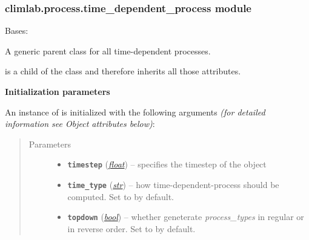 \documentclass[letterpaper,10pt,english]{sphinxmanual}
\begin{document}
\subsubsection{climlab.process.time\_dependent\_process module}
\label{api/climlab.process:climlab-process-time-dependent-process-module}\label{api/climlab.process:module-climlab.process.time_dependent_process}

\begin{fulllineitems}
\label{api/climlab.process:climlab.process.time_dependent_process.TimeDependentProcess}
Bases: {\hyperref[api/climlab.process:climlab.process.process.Process]{\emph{}}}

A generic parent class for all time-dependent processes.

 is a child of the 
{\hyperref[api/climlab.process:climlab.process.process.Process]{\emph{}}} class and therefore inherits
all those attributes.

\textbf{Initialization parameters}

An instance of  is initialized with the following 
arguments \emph{(for detailed information see Object attributes below)}:
\begin{quote}\begin{description}
\item[{Parameters}] \leavevmode\begin{itemize}
\item {} 
\textbf{\texttt{timestep}} (\href{http://docs.python.org/2.7/library/functions.html\#float}{\emph{float}}) -- specifies the timestep of the object

\item {} 
\textbf{\texttt{time\_type}} (\href{http://docs.python.org/2.7/library/functions.html\#str}{\emph{str}}) -- how time-dependent-process should be computed. 
Set to  by default.

\item {} 
\textbf{\texttt{topdown}} (\href{http://docs.python.org/2.7/library/functions.html\#bool}{\emph{bool}}) -- whether geneterate \emph{process\_types} in regular or 
in reverse order.
Set to  by default.


\end{itemize}
\end{description}
\end{quote}
\end{fulllineitems}
\end{document}
